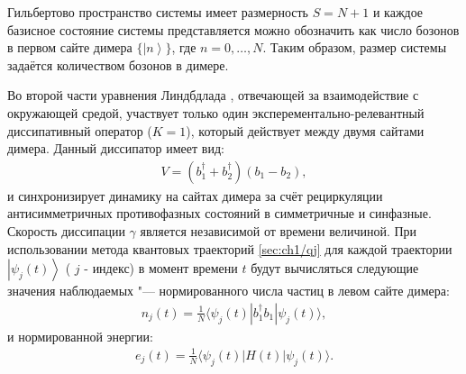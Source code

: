 Гильбертово пространство системы имеет размерность \(S = N + 1\) и каждое базисное состояние системы представляется можно обозначить как число бозонов в первом сайте димера \( \lbrace \left|n\right>\rbrace\), где \(n = 0,\ldots,N\). Таким образом, размер системы задаётся количеством бозонов в димере.

Во второй части уравнения Линдбдлада , отвечающей за взаимодействие с окружающей средой, участвует только один эксперементально-релевантный \cite{Diehl2008, Kraus2008} диссипативный оператор (\(K=1\)), который действует между двумя сайтами димера. Данный диссипатор имеет вид:
\begin{equation}
	\label{eq:dimer_diss}
	\begin{gathered}
		V = ( b^\dagger_1 + b^\dagger_2) \left( b_1 - b_2 \right),
	\end{gathered}
\end{equation}
и синхронизирует динамику на сайтах димера за счёт рециркуляции антисимметричных противофазных состояний в симметричные и синфазные. Скорость диссипации \(\gamma\) является независимой от времени величиной.
При использовании метода квантовых траекторий \cref{sec:ch1/qj} для каждой траектории \(\left| \psi_j(t) \right\rangle\) ( \(j\) - индекс) в момент времени \(t\) будут вычисляться следующие значения наблюдаемых "--- нормированного числа частиц в левом сайте димера:
\begin{equation}
	\label{eq:dimer_num_bosons}
	\begin{gathered}
		n_j(t) =  \frac{1}{N}\langle \psi_j(t)| b^\dagger_1 b_1 | \psi_j(t) \rangle,
	\end{gathered}
\end{equation}
и нормированной энергии:
\begin{equation}
	\label{eq:dimer_energy}
	\begin{gathered}
		e_j(t) = \frac{1}{N} \langle \psi_j(t)| H(t) | \psi_j(t) \rangle.
	\end{gathered}
\end{equation}

